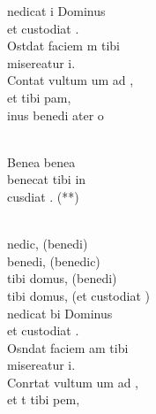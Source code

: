 \documentclass[12pt]{article}
\begin{document}
\begin{multicols*}{2}
        \begin{cancion}[Benedicat][]%
            nedicat i Dominus \\
            et custodiat .\\
            Ostdat faciem m tibi\\
             misereatur i.\\
            Contat vultum um ad ,\\
            et  tibi pam,\\
            inus benedi ater o \\\jump\\
            \begin{chorus}%
            Benea     benea \\
            benecat tibi in\\
             cusdiat . (**)\\
            \end{chorus}%
            \jump\\
            nedic, (benedi)\\
            benedi, (benedic)\\
            tibi domus, (benedi)\\
            tibi domus, (et custodiat )\\
        \jump
            nedicat bi Dominus\\
            et custodiat .\\
            Osndat faciem am tibi\\
             misereatur i.\\
            Conrtat vultum um ad ,\\
            et t tibi pem,\\

\end{cancion}
\end{multicols*}
\end{document}

